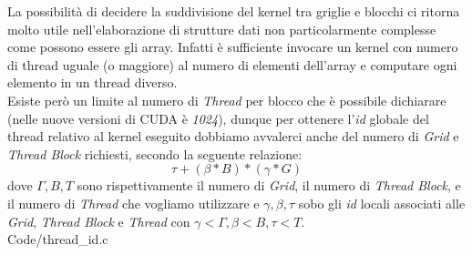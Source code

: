 La possibilità di decidere la suddivisione del kernel tra griglie e blocchi
ci ritorna molto utile nell'elaborazione di strutture dati non
particolarmente complesse come possono essere gli array.
Infatti è sufficiente invocare un kernel con numero di thread
uguale (o maggiore) al numero di elementi dell'array e computare ogni elemento
in un thread diverso.
\\
Esiste però un limite al numero di \textit{Thread} per blocco che è possibile
dichiarare (nelle nuove versioni di CUDA è \textit{1024}), dunque per ottenere
l'\textit{id} globale del thread relativo al kernel eseguito dobbiamo avvalerci anche
del numero di \textit{Grid} e \textit{Thread Block} richiesti, secondo la
seguente relazione:
$$\tau + (\beta * B) * (\gamma * G)$$
dove $\Gamma, B, T$ sono rispettivamente il numero di \textit{Grid},
il numero di \textit{Thread Block}, e il numero di \textit{Thread} che
vogliamo utilizzare e $\gamma, \beta, \tau$ sobo gli \textit{id} locali
associati alle \textit{Grid}, \textit{Thread Block} e
\textit{Thread} con $\gamma < \Gamma, \beta < B, \tau < T$.
\\

    {Code/thread_id.c}
